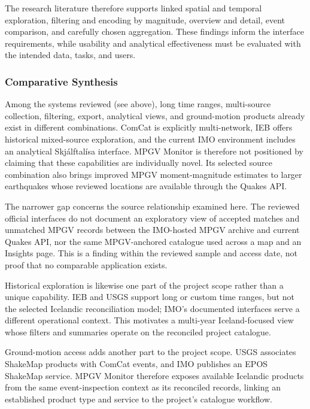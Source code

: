 \documentclass[12pt]{article}
\begin{document}
The research literature therefore supports linked spatial and temporal exploration, filtering and encoding by magnitude, overview and detail, event comparison, and carefully chosen aggregation. These findings inform the interface requirements, while usability and analytical effectiveness must be evaluated with the intended data, tasks, and users.

\subsubsection{Comparative Synthesis}

Among the systems reviewed (see above), long time ranges, multi-source collection, filtering, export, analytical views, and ground-motion products already exist in different combinations. ComCat is explicitly multi-network, IEB offers historical mixed-source exploration, and the current IMO environment includes an analytical Skj\'alftal\'isa interface. MPGV Monitor is therefore not positioned by claiming that these capabilities are individually novel. Its selected source combination also brings improved MPGV moment-magnitude estimates to larger earthquakes whose reviewed locations are available through the Quakes API.

The narrower gap concerns the source relationship examined here. The reviewed official interfaces do not document an exploratory view of accepted matches and unmatched MPGV records between the IMO-hosted MPGV archive and current Quakes API, nor the same MPGV-anchored catalogue used across a map and an Insights page. This is a finding within the reviewed sample and access date, not proof that no comparable application exists.

Historical exploration is likewise one part of the project scope rather than a unique capability. IEB and USGS support long or custom time ranges, but not the selected Icelandic reconciliation model; IMO's documented interfaces serve a different operational context. This motivates a multi-year Iceland-focused view whose filters and summaries operate on the reconciled project catalogue.

Ground-motion access adds another part to the project scope. USGS associates ShakeMap products with ComCat events, and IMO publishes an EPOS ShakeMap service. MPGV Monitor therefore exposes available Icelandic products from the same event-inspection context as its reconciled records, linking an established product type and service to the project's catalogue workflow.
\end{document}
